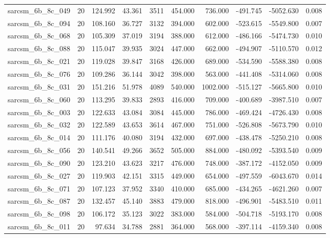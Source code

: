 \begin{tabular}{lrrrrrrrrr}
sarcsm\_6b\_8c\_049 & 20 & 124.992 & 43.361 & 3511 & 454.000 & 736.000 & -491.745 & -5052.630 & 0.008 \\
sarcsm\_6b\_8c\_094 & 20 & 108.160 & 36.727 & 3132 & 394.000 & 602.000 & -523.615 & -5549.800 & 0.007 \\
sarcsm\_6b\_8c\_068 & 20 & 105.309 & 37.019 & 3194 & 388.000 & 612.000 & -486.166 & -5474.730 & 0.010 \\
sarcsm\_6b\_8c\_088 & 20 & 115.047 & 39.935 & 3024 & 447.000 & 662.000 & -494.907 & -5110.570 & 0.012 \\
sarcsm\_6b\_8c\_021 & 20 & 119.028 & 39.847 & 3168 & 426.000 & 689.000 & -534.590 & -5588.380 & 0.008 \\
sarcsm\_6b\_8c\_076 & 20 & 109.286 & 36.144 & 3042 & 398.000 & 563.000 & -441.408 & -5314.060 & 0.008 \\
sarcsm\_6b\_8c\_031 & 20 & 151.216 & 51.978 & 4089 & 540.000 & 1002.000 & -515.127 & -5665.800 & 0.010 \\
sarcsm\_6b\_8c\_060 & 20 & 113.295 & 39.833 & 2893 & 416.000 & 709.000 & -400.689 & -3987.510 & 0.007 \\
sarcsm\_6b\_8c\_003 & 20 & 122.633 & 43.084 & 3084 & 445.000 & 786.000 & -469.424 & -4726.430 & 0.008 \\
sarcsm\_6b\_8c\_032 & 20 & 122.589 & 43.653 & 3614 & 467.000 & 751.000 & -526.808 & -5673.790 & 0.010 \\
sarcsm\_6b\_8c\_014 & 20 & 111.176 & 40.080 & 3194 & 432.000 & 697.000 & -438.478 & -5250.210 & 0.008 \\
sarcsm\_6b\_8c\_056 & 20 & 140.541 & 49.266 & 3652 & 505.000 & 884.000 & -480.092 & -5393.540 & 0.009 \\
sarcsm\_6b\_8c\_090 & 20 & 123.210 & 43.623 & 3217 & 476.000 & 748.000 & -387.172 & -4152.050 & 0.009 \\
sarcsm\_6b\_8c\_027 & 20 & 119.903 & 42.151 & 3315 & 449.000 & 654.000 & -497.559 & -6043.670 & 0.014 \\
sarcsm\_6b\_8c\_071 & 20 & 107.123 & 37.952 & 3340 & 410.000 & 685.000 & -434.265 & -4621.260 & 0.007 \\
sarcsm\_6b\_8c\_087 & 20 & 132.457 & 45.140 & 3883 & 479.000 & 818.000 & -496.901 & -5483.510 & 0.011 \\
sarcsm\_6b\_8c\_098 & 20 & 106.172 & 35.123 & 3022 & 383.000 & 584.000 & -504.718 & -5193.170 & 0.008 \\
sarcsm\_6b\_8c\_011 & 20 & 97.634 & 34.788 & 2881 & 364.000 & 568.000 & -397.114 & -4159.340 & 0.008 \\

\end{tabular}
